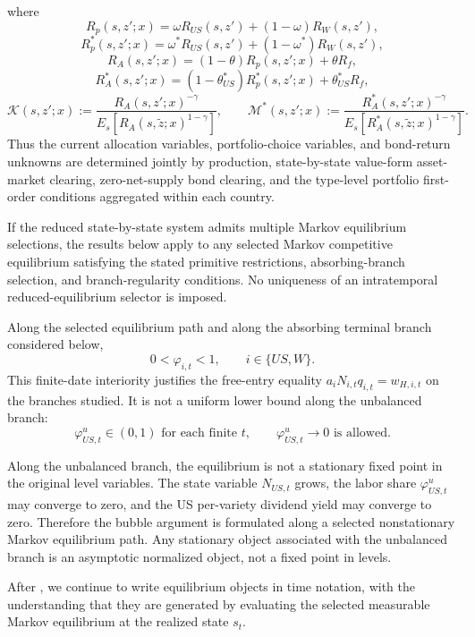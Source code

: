 \documentclass{article}
\begin{document}
where
\[
R_p(s,z';x)=\omega R_{US}(s,z')+(1-\omega)R_W(s,z'),
\]
\[
R_p^*(s,z';x)=\omega^*R_{US}(s,z')+(1-\omega^*)R_W(s,z'),
\]
\[
R_A(s,z';x)=(1-\theta)R_p(s,z';x)+\theta R_f,
\]
\[
R_A^*(s,z';x)
=(1-\theta_{US}^*)R_p^*(s,z';x)
+\theta_{US}^*R_f,
\]
\[
\mathcal K(s,z';x)
:=
\frac{R_A(s,z';x)^{-\gamma}}
{E_s\!\left[R_A(s,\tilde z;x)^{1-\gamma}\right]},
\qquad
\mathcal M^*(s,z';x)
:=
\frac{R_A^*(s,z';x)^{-\gamma}}
{E_s\!\left[R_A^*(s,\tilde z;x)^{1-\gamma}\right]}.
\]
Thus the current allocation variables, portfolio-choice variables, and bond-return unknowns are determined jointly by production, state-by-state value-form asset-market clearing, zero-net-supply bond clearing, and the type-level portfolio first-order conditions aggregated within each country.

If the reduced state-by-state system admits multiple Markov equilibrium selections, the results below apply to any selected Markov competitive equilibrium satisfying the stated primitive restrictions, absorbing-branch selection, and branch-regularity conditions. No uniqueness of an intratemporal reduced-equilibrium selector is imposed.

\begin{ass}\label{ass_pathwise_interior_innovation}
Along the selected equilibrium path and along the absorbing terminal branch considered below,
\[
0<\varphi_{i,t}<1,
\qquad
i\in\{US,W\}.
\]
This finite-date interiority justifies the free-entry equality $a_iN_{i,t}q_{i,t}=w_{H,i,t}$ on the branches studied. It is not a uniform lower bound along the unbalanced branch:
\[
\varphi_{US,t}^u\in(0,1)\text{ for each finite }t,
\qquad
\varphi_{US,t}^u\to0\text{ is allowed.}
\]
\end{ass}

Along the unbalanced branch, the equilibrium is not a stationary fixed point in the original level variables. The state variable $N_{US,t}$ grows, the labor share $\varphi_{US,t}^u$ may converge to zero, and the US per-variety dividend yield may converge to zero. Therefore the bubble argument is formulated along a selected nonstationary Markov equilibrium path. Any stationary object associated with the unbalanced branch is an asymptotic normalized object, not a fixed point in levels.

After , we continue to write equilibrium objects in time notation, with the understanding that they are generated by evaluating the selected measurable Markov equilibrium at the realized state $s_t$.
\end{document}
